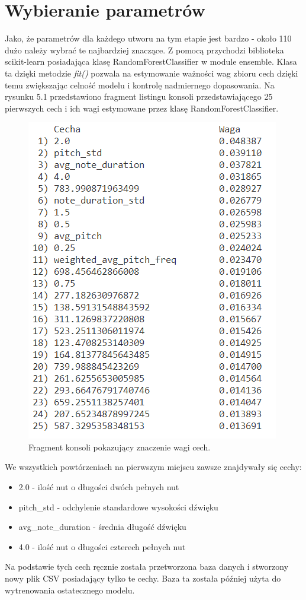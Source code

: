 \documentclass[printmode, eng, openany]{mgr}
\newcommand\tab[1][1cm]{\hspace*{#1}}
\begin{document}
\section{Wybieranie parametrów}
\tab Jako, że parametrów dla każdego utworu na tym etapie jest bardzo - około 110 dużo należy wybrać te najbardziej znaczące. Z pomocą przychodzi biblioteka scikit-learn posiadająca klasę RandomForestClassifier w module ensemble. Klasa ta dzięki metodzie \textit{fit()} pozwala na estymowanie ważności wag zbioru cech dzięki temu zwiększając celność modelu i kontrolę nadmiernego dopasowania. Na rysunku 5.1 przedstawiono fragment listingu konsoli przedstawiającego 25 pierwszych cech i ich wagi estymowane przez klasę RandomForestClassifier.\\
\begin{figure}[!htb]
\centering
\includegraphics{wagi}
\caption{Fragment konsoli pokazujący znaczenie wagi cech.}
\end{figure}
\tab We wszystkich powtórzeniach na pierwszym miejscu zawsze znajdywały się cechy: 
\begin{itemize}
\item 2.0 - ilość nut o długości dwóch pełnych nut
\item pitch\_std - odchylenie standardowe wysokości dźwięku
\item avg\_note\_duration - średnia długość dźwięku
\item 4.0 - ilość nut o długości czterech pełnych nut
\end{itemize}
\tab Na podstawie tych cech ręcznie została przetworzona baza danych i stworzony nowy plik CSV posiadający tylko te cechy. Baza ta została później użyta do wytrenowania ostatecznego modelu.\newpage
\end{document}

